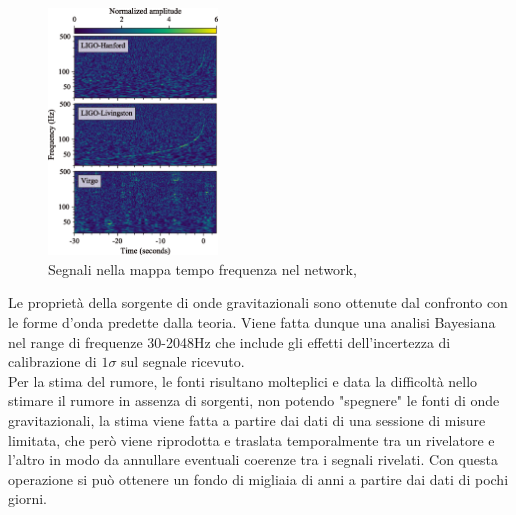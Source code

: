 \begin{figure}
	\vspace{-15pt}
	\begin{center}
		\includegraphics[width=0.4\textwidth]{figures/Capitolo_1/gw170817_time_freq.png}
	\end{center}
	\vspace{-7pt}
	\caption{Segnali nella mappa tempo frequenza nel network, \cite{Abbott_2017a}}
	\label{fig:osservazione_gw170817}
	\vspace{-15pt}
\end{figure}
Le proprietà della sorgente di onde gravitazionali sono ottenute dal confronto con le forme d'onda predette dalla teoria. Viene fatta dunque una analisi Bayesiana nel range di frequenze 30-2048Hz che include gli effetti dell'incertezza di calibrazione di $1\sigma$ sul segnale ricevuto.\\Per la stima del rumore, le fonti risultano molteplici e data la difficoltà nello stimare il rumore in assenza di sorgenti, non potendo "spegnere" le fonti di onde gravitazionali, la stima viene fatta a partire dai dati di una sessione di misure limitata, che però viene riprodotta e traslata temporalmente tra un rivelatore e l'altro in modo da annullare eventuali coerenze tra i segnali rivelati. Con questa operazione si può ottenere un fondo di migliaia di anni a partire dai dati di pochi giorni.

